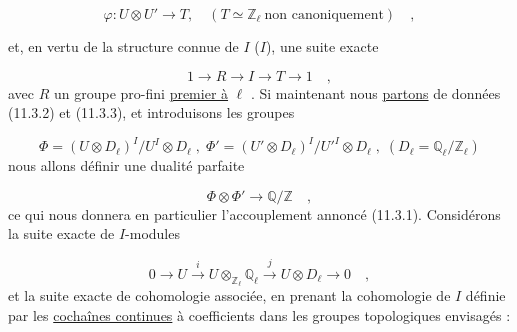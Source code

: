 \begin{equation}\tag{11.3.2}
\varphi : U \otimes U' \longrightarrow T, \quad (T \simeq \mathbb{Z}_\ell \ \text{non canoniquement}) \quad ,
\end{equation}


et, en vertu de la structure connue de $I$ ($I$\hspace{2.5em}), une suite exacte

\begin{equation}\tag{11.3.3}
1 \longrightarrow R \longrightarrow I \longrightarrow T \longrightarrow 1 \quad ,
\end{equation}
avec $R$ un groupe pro-fini \underline{premier à} $\ell$ . Si maintenant nous \underline{partons} de données (11.3.2) et (11.3.3), et introduisons les groupes

\begin{equation}\tag{11,3.4}
\Phi = (U\otimes D_\ell)^I/U^I\otimes D_\ell \;,\; \Phi' = (U'\otimes D_\ell)^I/{U'}^{I}\otimes D_\ell \;,\; (D_\ell = \mathbb{Q}_\ell/\mathbb{Z}_\ell)
\end{equation}
nous allons définir une dualité parfaite

\begin{equation}\tag{11.3.5}
\Phi \otimes \Phi' \longrightarrow \mathbb{Q}/\mathbb{Z} \quad ,
\end{equation}
ce qui nous donnera en particulier l'accouplement annoncé (11.3.1). Considérons la suite exacte de $I$-modules

\begin{equation}\tag{11.3.6}
0 \longrightarrow U \xrightarrow{\ i\ } U\otimes_{\mathbb{Z}_\ell}\mathbb{Q}_\ell \xrightarrow{\ j\ } U\otimes D_\ell \longrightarrow 0 \quad ,
\end{equation}
et la suite exacte de cohomologie associée, en prenant la cohomologie de $I$ définie par les \underline{cochaînes continues} à coefficients dans les groupes topologiques envisagés :

